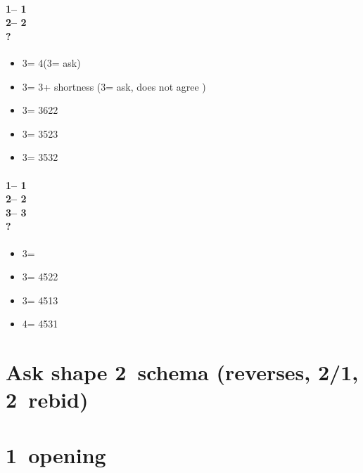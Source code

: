 \documentclass[12pt, a4paper]{report}
\begin{document}
{{        \subsubsection*{1\hearts -- 1\spades\\
                        2\spades -- 2\nt\\
                        ?}
        \begin{itemize}
            \item 3\clubs = 4\spades (3\diams = ask)
            \item 3\diams = 3\spades + shortness (3\hearts = ask, does not agree \spades)
            \item 3\hearts = 3622
            \item 3\spades = 3523
            \item 3\nt = 3532
        \end{itemize}

        \subsubsection*{1\hearts -- 1\spades\\
                        2\spades -- 2\nt\\
                        3\clubs -- 3\diams\\
                        ?}
        \begin{itemize}
            \item 3\hearts = \bal
            \item 3\spades = 4522
            \item 3\nt = 4513
            \item 4\clubs = 4531
        \end{itemize}
    }

    \chapter*{\colorbox{Plum!30}{Ask shape 2\ntch\ schema}
            \colorbox{Plum!30}{(reverses, 2/1, 2\ntch\ rebid)}}
     {

    }

    \chapter*{\colorbox{Plum!30}{1\ntch\ opening}}
     {
}}
\end{document}

